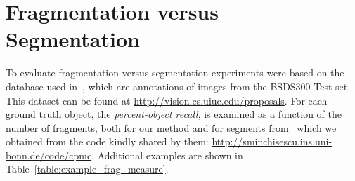 \documentclass[runningheads,a4paper]{llncs}
\begin{document}
\section{Fragmentation versus Segmentation}
To evaluate fragmentation versus segmentation experiments were based on the database used in~\cite{Endres:Hoiem:ECCV10}, which are annotations of images from the BSDS300 Test set. This dataset can be  found at \url{http://vision.cs.uiuc.edu/proposals}.  For each ground truth object, the {\it percent-object recall}, is examined as a function of the number of fragments, both for our method and for segments from~\cite{Carreira:Sminchisescu:PAMI12} which we obtained from the code kindly shared by them: \url{http://sminchisescu.ins.uni-bonn.de/code/cpmc}. Additional examples are shown in Table~\ref{table:example_frag_measure}.



\end{document}
